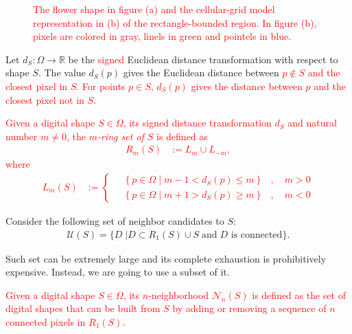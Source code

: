 \documentclass[smallextended]{svjour3}       %
\newcommand{\revision}[1]{\textcolor{red}{#1}}
\begin{document}
\begin{figure}[h!]
{	}
	\caption{\revision{The flower shape in figure (a) and the cellular-grid model representation in (b) of the rectangle-bounded region. In figure (b), pixels are colored in gray, linels in green and pointels in blue.}}
	\label{fig:cellular-grid-model}
\end{figure}


Let $d_{S}:\Omega \rightarrow \mathbb{R}$ be the \revision{signed} Euclidean distance transformation with respect to shape $S$. The value $d_S(p)$ gives the Euclidean distance between \revision{$p \notin S$ and the closest pixel in $S$. For points $p \in S$, $d_S(p)$ gives the distance between $p$ and the closest pixel not in $S$.}


\begin{definition}
\revision{
Given a digital shape $S\in\Omega$, its signed distance transformation $d_S$ and natural number $m \neq 0$, the {\em $m$-ring set of $S$} is defined as
\begin{align*}
	R_m(S) &:= L_m \cup L_{-m},
\end{align*}
where
\begin{align*}
	L_m(S) &:= \left\{ \quad \begin{array}{cc}
		\left\{ p \in \Omega \; | \; m-1 < d_S(p) \leq m \right\} & , \quad m>0\\
		\left\{ p \in \Omega \; | \; m+1 > d_S(p) \geq m \right\} & , \quad m<0
		\end{array} \right.
\end{align*}}
\end{definition}

Consider the following set of neighbor candidates to $S$:
\begin{align*}
\mathcal{U}(S) = \{ D \; | D \subset R_1(S) \cup S \; \text{and} \; \text{$D$ is connected} \}.
\end{align*}


Such set can be extremely large and its complete exhaustion is prohibitively expensive.  Instead, we are going to use a subset of it.

\begin{definition}[$n$-neighborhood]
\revision{
	Given a digital shape $S \in \Omega$, its $n$-neighborhood $\mathcal{N}_n(S)$ is defined as the set of digital shapes that can be built from $S$ by adding or removing a sequence of $n$ connected pixels in $R_1(S)$.
}
\end{definition}
\end{document}
